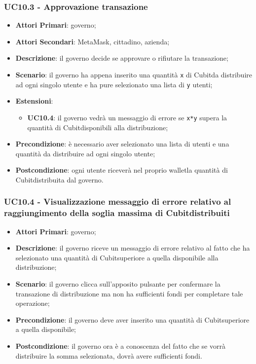 \subsubsection{UC10.3 - Approvazione transazione}
\begin{itemize}
	\item \textbf{Attori Primari}: governo;
	\item \textbf{Attori Secondari}: MetaMask\glo, cittadino, azienda\glo;
	\item \textbf{Descrizione}: il governo decide se approvare o rifiutare la transazione;
	\item \textbf{Scenario}: il governo ha appena inserito una quantità \texttt{x} di Cubit\glosp da distribuire ad ogni singolo utente e ha pure selezionato una lista di \texttt{y} utenti;
	\item \textbf{Estensioni}:
	\begin{itemize}
		\item \textbf{UC10.4}: il governo vedrà un messaggio di errore se \texttt{x*y} supera la quantità di Cubit\glosp disponibili alla distribuzione;
	\end{itemize}
	\item \textbf{Precondizione}: è necessario aver selezionato una lista di utenti e una quantità da distribuire ad ogni singolo utente;
	\item \textbf{Postcondizione}: ogni utente riceverà nel proprio wallet\glosp la quantità di Cubit\glosp distribuita dal governo.
\end{itemize}
\subsubsection{UC10.4 - Visualizzazione messaggio di errore relativo al raggiungimento della soglia massima di Cubit\glosp distribuiti}
\begin{itemize}
	\item \textbf{Attori Primari}: governo;
	\item \textbf{Descrizione}: il governo riceve un messaggio di errore relativo al fatto che ha selezionato una quantità di Cubit\glosp superiore a quella disponibile alla distribuzione;
	\item \textbf{Scenario}: il governo clicca sull'apposito pulsante per confermare la transazione di distribuzione ma non ha sufficienti fondi per completare tale operazione;
	\item \textbf{Precondizione}: il governo deve aver inserito una quantità di Cubit\glosp superiore a quella disponibile;
	\item \textbf{Postcondizione}: il governo ora è a conoscenza del fatto che se vorrà distribuire la somma selezionata, dovrà avere sufficienti fondi.
	
\end{itemize} 
